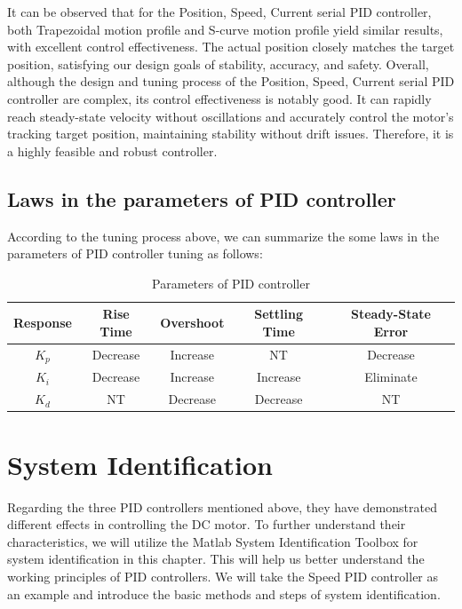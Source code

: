 \documentclass[11pt,a4paper]{article}%
\begin{document}
It can be observed that for the Position, Speed, Current serial PID controller, both Trapezoidal motion profile and S-curve motion profile yield similar results, with excellent control effectiveness. The actual position closely matches the target position, satisfying our design goals of stability, accuracy, and safety. Overall, although the design and tuning process of the Position, Speed, Current serial PID controller are complex, its control effectiveness is notably good. It can rapidly reach steady-state velocity without oscillations and accurately control the motor's tracking target position, maintaining stability without drift issues. Therefore, it is a highly feasible and robust controller.

\subsection{Laws in the parameters of PID controller}
According to the tuning process above, we can summarize the some laws in the parameters of PID controller tuning as follows:
\begin{table}[H]
    \centering
    \caption{Parameters of PID controller}
    \label{law}
    \begin{tabular}{ccccc}
    \toprule
        \textbf{Response} & \textbf{Rise Time} & \textbf{Overshoot} & \textbf{Settling Time} & \textbf{Steady-State Error}\\
    \midrule
        $K_p$ & Decrease & Increase & NT & Decrease \\

        $K_i$ & Decrease & Increase & Increase & Eliminate \\

        $K_d$ & NT & Decrease & Decrease & NT \\
    \bottomrule
    \end{tabular}
\end{table}

\newpage
\section{System Identification}
Regarding the three PID controllers mentioned above, they have demonstrated different effects in controlling the DC motor. To further understand their characteristics, we will utilize the Matlab System Identification Toolbox for system identification in this chapter. This will help us better understand the working principles of PID controllers. We will take the Speed PID controller as an example and introduce the basic methods and steps of system identification.
\end{document}
